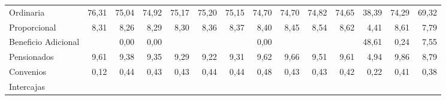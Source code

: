 \begin{tabular}{llllllllllllll}
\multicolumn{1}{l}{\hspace{1em}Ordinaria} &
  \multicolumn{1}{|r}{76,31} &
  \multicolumn{1}{r}{75,04} &
  \multicolumn{1}{r}{74,92} &
  \multicolumn{1}{r}{75,17} &
  \multicolumn{1}{r}{75,20} &
  \multicolumn{1}{r}{75,15} &
  \multicolumn{1}{r}{74,70} &
  \multicolumn{1}{r}{74,70} &
  \multicolumn{1}{r}{74,82} &
  \multicolumn{1}{r}{74,65} &
  \multicolumn{1}{r}{38,39} &
  \multicolumn{1}{r}{74,29} &
  \multicolumn{1}{r}{69,32} \\
\multicolumn{1}{l}{\hspace{1em}Proporcional} &
  \multicolumn{1}{|r}{8,31} &
  \multicolumn{1}{r}{8,26} &
  \multicolumn{1}{r}{8,29} &
  \multicolumn{1}{r}{8,30} &
  \multicolumn{1}{r}{8,36} &
  \multicolumn{1}{r}{8,37} &
  \multicolumn{1}{r}{8,40} &
  \multicolumn{1}{r}{8,45} &
  \multicolumn{1}{r}{8,54} &
  \multicolumn{1}{r}{8,62} &
  \multicolumn{1}{r}{4,41} &
  \multicolumn{1}{r}{8,61} &
  \multicolumn{1}{r}{7,79} \\
\multicolumn{1}{l}{\hspace{1em}Beneficio Adicional} &
  \multicolumn{1}{|r}{} &
  \multicolumn{1}{r}{0,00} &
  \multicolumn{1}{r}{0,00} &
  \multicolumn{1}{r}{} &
  \multicolumn{1}{r}{} &
  \multicolumn{1}{r}{} &
  \multicolumn{1}{r}{0,00} &
  \multicolumn{1}{r}{} &
  \multicolumn{1}{r}{} &
  \multicolumn{1}{r}{} &
  \multicolumn{1}{r}{48,61} &
  \multicolumn{1}{r}{0,24} &
  \multicolumn{1}{r}{7,55} \\
\multicolumn{1}{l}{\hspace{1em}Pensionados} &
  \multicolumn{1}{|r}{9,61} &
  \multicolumn{1}{r}{9,38} &
  \multicolumn{1}{r}{9,35} &
  \multicolumn{1}{r}{9,29} &
  \multicolumn{1}{r}{9,22} &
  \multicolumn{1}{r}{9,31} &
  \multicolumn{1}{r}{9,62} &
  \multicolumn{1}{r}{9,66} &
  \multicolumn{1}{r}{9,51} &
  \multicolumn{1}{r}{9,61} &
  \multicolumn{1}{r}{4,94} &
  \multicolumn{1}{r}{9,86} &
  \multicolumn{1}{r}{8,79} \\
\multicolumn{1}{l}{\hspace{1em}Convenios} &
  \multicolumn{1}{|r}{0,12} &
  \multicolumn{1}{r}{0,44} &
  \multicolumn{1}{r}{0,43} &
  \multicolumn{1}{r}{0,43} &
  \multicolumn{1}{r}{0,44} &
  \multicolumn{1}{r}{0,44} &
  \multicolumn{1}{r}{0,48} &
  \multicolumn{1}{r}{0,43} &
  \multicolumn{1}{r}{0,43} &
  \multicolumn{1}{r}{0,42} &
  \multicolumn{1}{r}{0,22} &
  \multicolumn{1}{r}{0,41} &
  \multicolumn{1}{r}{0,38} \\
\multicolumn{1}{l}{\hspace{1em}Intercajas} &

\end{tabular}

